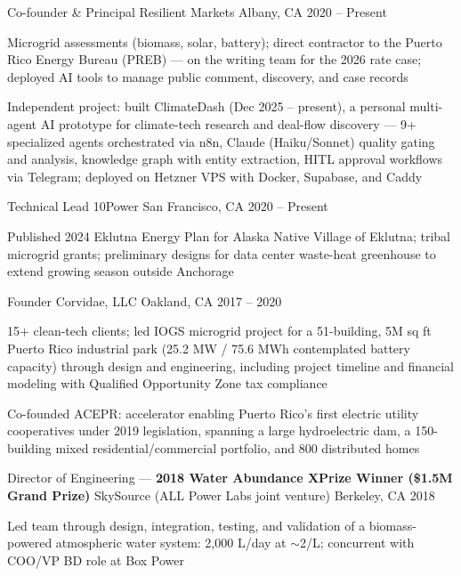
\begin{cventries}

  \cventry
    {Co-founder \& Principal}
    {Resilient Markets}
    {Albany, CA}
    {2020 -- Present}
    {
      \begin{cvitems}
        \item {Microgrid assessments (biomass, solar, battery); direct contractor to the Puerto Rico Energy Bureau (PREB) — on the writing team for the 2026 rate case; deployed AI tools to manage public comment, discovery, and case records}
        \item {Independent project: built ClimateDash (Dec 2025 -- present), a personal multi-agent AI prototype for climate-tech research and deal-flow discovery — 9+ specialized agents orchestrated via n8n, Claude (Haiku/Sonnet) quality gating and analysis, knowledge graph with entity extraction, HITL approval workflows via Telegram; deployed on Hetzner VPS with Docker, Supabase, and Caddy}
      \end{cvitems}
    }

  \cventry
    {Technical Lead}
    {10Power}
    {San Francisco, CA}
    {2020 -- Present}
    {
      \begin{cvitems}
        \item {Published 2024 Eklutna Energy Plan for Alaska Native Village of Eklutna; tribal microgrid grants; preliminary designs for data center waste-heat greenhouse to extend growing season outside Anchorage}
      \end{cvitems}
    }

  \cventry
    {Founder}
    {Corvidae, LLC}
    {Oakland, CA}
    {2017 -- 2020}
    {
      \begin{cvitems}
        \item {15+ clean-tech clients; led IOGS microgrid project for a 51-building, 5M sq ft Puerto Rico industrial park (25.2 MW / 75.6 MWh contemplated battery capacity) through design and engineering, including project timeline and financial modeling with Qualified Opportunity Zone tax compliance}
        \item {Co-founded ACEPR: accelerator enabling Puerto Rico's first electric utility cooperatives under 2019 legislation, spanning a large hydroelectric dam, a 150-building mixed residential/commercial portfolio, and 800 distributed homes}
      \end{cvitems}
    }

  \cventry
    {Director of Engineering — \textbf{2018 Water Abundance XPrize Winner (\$1.5M Grand Prize)}}
    {SkySource (ALL Power Labs joint venture)}
    {Berkeley, CA}
    {2018}
    {
      \begin{cvitems}
        \item {Led team through design, integration, testing, and validation of a biomass-powered atmospheric water system: 2,000 L/day at ${\sim}$2\textcent/L; concurrent with COO/VP BD role at Box Power}
      \end{cvitems}
    }


\end{cventries}
